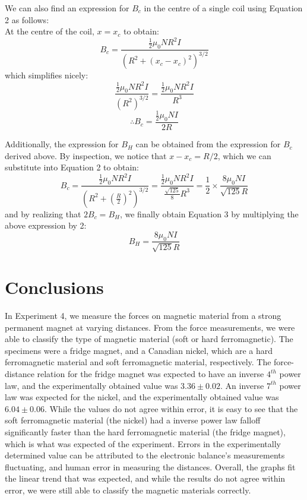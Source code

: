 \documentclass[letterpaper]{article}
\begin{document}
We can also find an expression for $B_c$ in the centre of a single coil using Equation 2 as follows:\\
At the centre of the coil, $x=x_c$ to obtain:
$$ B_c = \frac{\frac{1}{2} \mu_0NR^2I}{(R^2+(x_c-x_c)^2)^{3/2}} $$
which simplifies nicely:
$$ \frac{\frac{1}{2} \mu_0NR^2I}{(R^2)^{3/2}} = \frac{\frac{1}{2} \mu_0NR^2I}{R^3}  $$
$$ \therefore B_c = \frac{\frac{1}{2} \mu_0NI}{2R} $$

Additionally, the expression for $B_H$ can be obtained from the expression for $B_c$ derived above. By inspection,
we notice that $x-x_c=R/2$, which we can substitute into Equation 2 to obtain:
$$ B_c= \frac{\frac{1}{2}\mu_0NR^2I}{(R^2+(\frac{R}{2})^2)^{3/2}} = \frac{\frac{1}{2}\mu_0NR^2I}{\frac{\sqrt{125}}{8}R^3} = \frac{1}{2}\times \frac{8\mu_0NI}{\sqrt{125}R} $$
and by realizing that $2B_c=B_H$, we finally obtain Equation 3 by multiplying the above expression by 2:
$$B_H=\frac{8\mu_0NI}{\sqrt{125}R}$$


\section{Conclusions}
In Experiment 4, we measure the forces on magnetic material from a strong permanent magnet at varying distances.
From the force measurements, we were able to classify the type
of magnetic material (soft or hard ferromagnetic). The specimens were a fridge magnet, and a Canadian nickel, which are
a hard ferromagnetic material and soft ferromagnetic material, respectively.
The force-distance relation for the fridge magnet was expected to have an inverse $4^{th}$ power law, and the experimentally obtained
value was $3.36\pm0.02$.
An inverse $7^{th}$ power law was expected for the nickel, and the experimentally obtained value was $6.04\pm0.06$.
While the values do not agree within error, it is easy to see that the soft ferromagnetic material (the nickel) had a inverse power law
falloff significantly faster than the hard ferromagnetic material (the fridge magnet), which is what was expected of the experiment.
Errors in the experimentally determined value can be attributed to the electronic balance's measurements fluctuating, and
human error in measuring the distances. Overall, the graphs fit the linear trend that was expected, and while the
results do not agree within error, we were still able to classify the magnetic materials correctly.



\end{document}
